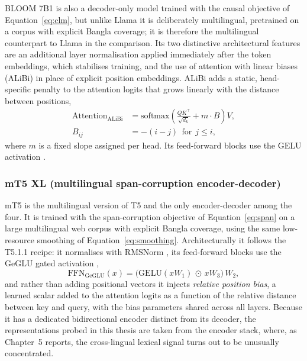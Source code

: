 BLOOM 7B1 \cite{scao2022bloom} is also a decoder-only model trained with the causal objective of Equation~\eqref{eq:clm}, but unlike Llama it is deliberately multilingual, pretrained on a corpus with explicit Bangla coverage; it is therefore the multilingual counterpart to Llama in the comparison. Its two distinctive architectural features are an additional layer normalisation applied immediately after the token embeddings, which stabilises training, and the use of attention with linear biases (ALiBi) \cite{press2022alibi} in place of explicit position embeddings. ALiBi adds a static, head-specific penalty to the attention logits that grows linearly with the distance between positions,
\begin{equation}
\label{eq:alibi}
\begin{aligned}
\mathrm{Attention}_{\mathrm{ALiBi}} &= \mathrm{softmax}\!\left(\frac{QK^{\top}}{\sqrt{d_k}} + m\cdot B\right)V, \\
B_{ij} &= -(i-j)\ \ \text{for}\ \ j\le i,
\end{aligned}
\end{equation}
where $m$ is a fixed slope assigned per head. Its feed-forward blocks use the GELU activation \cite{hendrycks2016gelu}.

\subsubsection{mT5 XL (multilingual span-corruption encoder-decoder)}

mT5 \cite{xue2021mt5} is the multilingual version of T5 and the only encoder-decoder among the four. It is trained with the span-corruption objective of Equation~\eqref{eq:span} on a large multilingual web corpus with explicit Bangla coverage, using the same low-resource smoothing of Equation~\eqref{eq:smoothing}. Architecturally it follows the T5.1.1 recipe: it normalises with RMSNorm \cite{zhang2019rmsnorm}, its feed-forward blocks use the GeGLU gated activation \cite{shazeer2020glu},
\begin{equation}
\label{eq:geglu}
\mathrm{FFN}_{\mathrm{GeGLU}}(x) = \big(\mathrm{GELU}(xW_1)\,\odot\,xW_3\big)\,W_2,
\end{equation}
and rather than adding positional vectors it injects \emph{relative position bias}, a learned scalar added to the attention logits as a function of the relative distance between key and query, with the bias parameters shared across all layers. Because it has a dedicated bidirectional encoder distinct from its decoder, the representations probed in this thesis are taken from the encoder stack, where, as Chapter~5 reports, the cross-lingual lexical signal turns out to be unusually concentrated.

